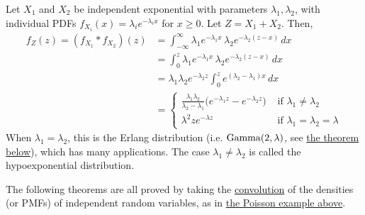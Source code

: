   \begin{example}
    \label{ex:sum-of-two-independent-exponentials}
    Let $X_1$ and $X_2$ be independent exponential with parameters $\lambda_1, \lambda_2$, with individual PDFs $f_{X_i} (x) = \lambda_i e^{-\lambda_i x}$ for $x \geq 0$. Let $Z = X_1 + X_2$. Then, 
    \begin{align*}
      f_Z (z) = (f_{X_1} \ast f_{X_2})(z) & = \int_{-\infty}^\infty \lambda_1 e^{-\lambda_1 x} \, \lambda_2 e^{-\lambda_2 (z -x)} \, dx \\
      & = \int_{0}^z \lambda_1 e^{-\lambda_1 x} \, \lambda_2 e^{-\lambda_2 (z -x)} \, dx \\ 
      & = \lambda_1 \lambda_2 e^{-\lambda_2 z} \int_0^z e^{(\lambda_2 - \lambda_1) x}\,dx \\
      & = \begin{cases} \frac{\lambda_1 \lambda_2}{\lambda_2 - \lambda_1} \big( e^{-\lambda_1 z} - e^{-\lambda_2 z} \big) & \text{ if } \lambda_1 \neq \lambda_2 \\
      \lambda^2 z e^{-\lambda z} & \text{ if } \lambda_1 = \lambda_2 = \lambda \end{cases} 
    \end{align*}
    When $\lambda_1 = \lambda_2$, this is the Erlang distribution (i.e. $\operatorname{Gamma}(2, \lambda)$, see \hyperref[thm:sum-of-independent-exponentials-is-gamma]{the theorem below}), which has many applications. The case $\lambda_1 \neq \lambda_2$ is called the hypoexponential distribution. 
  \end{example}

  The following theorems are all proved by taking the \hyperref[def:convolution]{convolution} of the densities (or PMFs) of independent random variables, as in \hyperref[ex:sums-of-poisson-rvs]{the Poisson example above}. 

